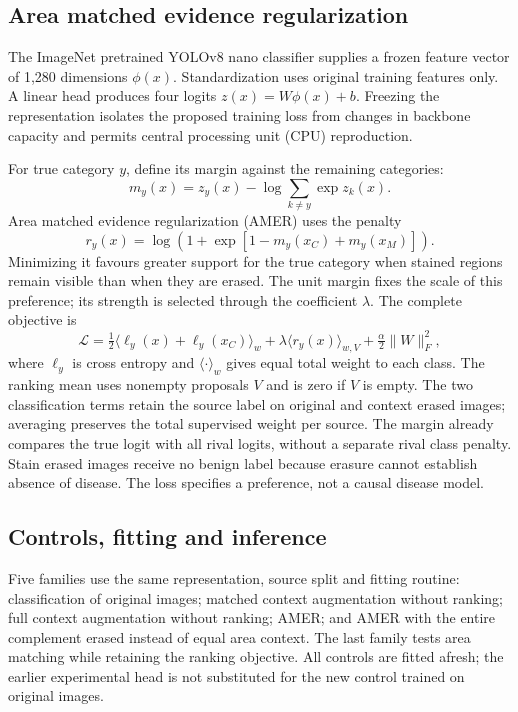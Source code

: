 \documentclass[conference,letterpaper]{IEEEtran}
\begin{document}
\subsection{Area matched evidence regularization}
The ImageNet pretrained YOLOv8 nano classifier supplies a frozen feature vector of 1,280 dimensions $\phi(x)$. Standardization uses original training features only. A linear head produces four logits $z(x)=W\phi(x)+b$. Freezing the representation isolates the proposed training loss from changes in backbone capacity and permits central processing unit (CPU) reproduction.

For true category $y$, define its margin against the remaining categories:
\begin{equation}
m_y(x)=z_y(x)-\log\sum_{k\ne y}\exp z_k(x).
\end{equation}
Area matched evidence regularization (AMER) uses the penalty
\begin{equation}
r_y(x)=
\log\left(1+\exp\left[1-m_y(x_C)+m_y(x_M)\right]\right).
\end{equation}
Minimizing it favours greater support for the true category when stained regions remain visible than when they are erased. The unit margin fixes the scale of this preference; its strength is selected through the coefficient $\lambda$. The complete objective is
\begin{equation}
\mathcal{L}=\tfrac12\langle\ell_y(x)+\ell_y(x_C)\rangle_w
+\lambda\langle r_y(x)\rangle_{w,V}+\tfrac{\alpha}{2}\|W\|_F^2,
\end{equation}
where $\ell_y$ is cross entropy and $\langle\cdot\rangle_w$ gives equal total weight to each class. The ranking mean uses nonempty proposals $V$ and is zero if $V$ is empty. The two classification terms retain the source label on original and context erased images; averaging preserves the total supervised weight per source. The margin already compares the true logit with all rival logits, without a separate rival class penalty. Stain erased images receive no benign label because erasure cannot establish absence of disease. The loss specifies a preference, not a causal disease model.

\subsection{Controls, fitting and inference}
Five families use the same representation, source split and fitting routine: classification of original images; matched context augmentation without ranking; full context augmentation without ranking; AMER; and AMER with the entire complement erased instead of equal area context. The last family tests area matching while retaining the ranking objective. All controls are fitted afresh; the earlier experimental head is not substituted for the new control trained on original images.
\end{document}
